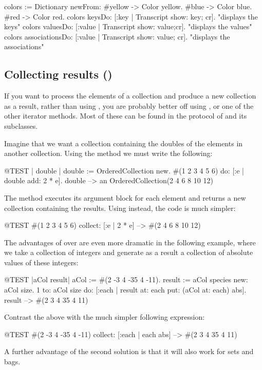 \documentclass[a4paper,10pt,twoside]{book}
\begin{document}
\begin{code}{}
colors := Dictionary newFrom: {#yellow -> Color yellow. #blue -> Color blue. #red -> Color red}.
colors keysDo: [:key | Transcript show: key; cr].                    "displays the keys"
colors valuesDo: [:value | Transcript show: value;cr].            "displays the values"
colors associationsDo: [:value | Transcript show: value; cr].  "displays the associations"
\end{code}

\subsection{Collecting results ()}
If you want to process the elements of a collection and produce a new collection as a result, rather than using , you are probably better off using , or one of the other iterator methods.
Most of these can be found in the  protocol of  and its subclasses.

Imagine that we want a collection containing the doubles of the elements in another collection.
Using the method  we must write the following:

\begin{code}{@TEST | double |}
double := OrderedCollection new.
#(1 2 3 4 5 6) do: [:e | double add: 2 * e].
double --> an OrderedCollection(2 4 6 8 10 12)
\end{code}

\noindent
The method  executes its argument block for each element and returns a new collection containing the results. 
Using  instead, the code is much simpler:
\begin{code}{@TEST}
#(1 2 3 4 5 6) collect: [:e | 2 * e] --> #(2 4 6 8 10 12)
\end{code}

The advantages of  over  are even more dramatic in the following example, where we take a collection of integers and generate as a result a collection of absolute values of these integers:

\begin{code}{@TEST |aCol result|}
aCol :=  #(2 -3 4 -35 4 -11).
result := aCol species new: aCol size.
1 to: aCol size do: [:each | result at: each put: (aCol at: each) abs].
result --> #(2 3 4 35 4 11)
\end{code}
\noindent
Contrast the above with the much simpler following expression:
\begin{code}{@TEST}
#(2 -3 4 -35 4 -11) collect: [:each | each abs] --> #(2 3 4 35 4 11)
\end{code}
\noindent
A further advantage of the second solution is that it will also work for sets and bags.
\end{document}
